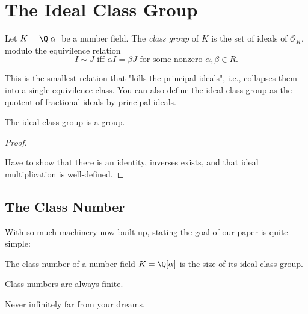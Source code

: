 \section{The Ideal Class Group}

\begin{definition}
	Let $K = \Q[\alpha]$ be a number field. The \textit{class group} of $K$ is the set of ideals of $\mathcal O_K$, modulo the equivilence relation
	\begin{equation*}
		I \sim J \text{ iff } \alpha I = \beta J \text{ for some nonzero } \alpha, \beta \in R.
	\end{equation*}
\end{definition}

This is the smallest relation that "kills the principal ideals", i.e., collapses them into a single equivilence class.
You can also define the ideal class group as the quotent of fractional ideals by principal ideals.

\begin{theorem}
	The ideal class group is a group.
\end{theorem}

\begin{proof}
	\begin{lemma}
	\end{lemma}

	Have to show that there is an identity, inverses exists, and that ideal multiplication is well-defined.
\end{proof}

\subsection{The Class Number}

With so much machinery now built up, stating the goal of our paper is quite simple:

\begin{definition}
	The class number of a number field $K = \Q[\alpha]$ is the size of its ideal class group.
\end{definition}

\begin{theorem}
	Class numbers are always finite.
\end{theorem}

Never infinitely far from your dreams.


